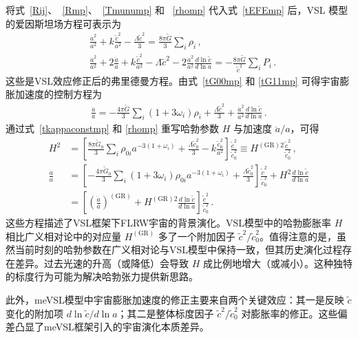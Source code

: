 \documentclass[jkps,preprint,fleqn]{revtex4}
\newcommand{\tc}{\tilde{c}}
\newcommand{\tG}{\tilde{G}}
\newcommand{\GR}{\text{GR}}
\begin{document}
将式~\eqref{Rij}、~\eqref{Rmp}、~\eqref{Tmunump} 和 ~\eqref{rhomp} 代入式~\eqref{tEFEmp} 后，VSL 模型的爱因斯坦场方程可表示为
\begin{align}
 &\frac{\dot{a}^2}{a^2} + k \frac{\tc^2}{a^2}  -\frac{ \Lambda \tc^2}{3} = \frac{8 \pi \tG}{3} \sum_i \rho_i \label{tG00mp} \,, \\
 &\frac{\dot{a}^2}{a^2} + 2 \frac{\ddot{a}}{a} +  k \frac{\tc^2}{a^2} - \Lambda \tc^2 - 2 \frac{\dot{a}^2}{a^2} \frac{d \ln \tc}{d \ln a} = -\frac{8 \pi \tG}{\tc^2} \sum_{i} P_i  \label{tG11mp} \,.
 \end{align}
这些是VSL效应修正后的弗里德曼方程。由式~\eqref{tG00mp} 和 \eqref{tG11mp} 可得宇宙膨胀加速度的控制方程为
\begin{align}
 \frac{\ddot{a}}{a} = -\frac{4\pi \tG}{3} \sum_i \left( 1 + 3 \omega_i \right) \rho_i  + \frac{\Lambda \tc^2}{3} + \frac{\dot{a}^2}{a^2} \frac{d \ln \tc}{d \ln a} \label{t3G11mG00mp} \,.
 \end{align}
通过式~\eqref{tkappaconstmp} 和 \eqref{rhomp} 重写哈勃参数 $H$ 与加速度 $\ddot{a}/a$，可得
\begin{align}
 H^2 &= \left[ \frac{8 \pi \tG_0}{3} \sum_{i} \rho_{0i} a^{-3(1+\omega_i)} + \frac{ \Lambda \tc_0^2}{3} - k \frac{\tc_0^2}{a^2} \right] \frac{\tc^2}{\tc_0^2} \equiv H^{(\GR)2} \frac{\tc^2}{\tc_0^2} \label{H2me} \,, \\
 \frac{\ddot{a}}{a} &= \left[ -\frac{4\pi \tG_0}{3} \sum_i \left( 1 + 3 \omega_i \right) \rho_{0i} a^{-3(1+\omega_i)} + \frac{\Lambda \tc_0^2}{3} \right] \frac{\tc^2}{\tc_0^2} + H^2 \frac{d \ln \tc}{d \ln a} \nonumber \\
 &= \left[ \left( \frac{\ddot{a}}{a} \right)^{(\GR)} +  H^{(\GR)2} \frac{d \ln \tc}{d \ln a}  \right] \frac{\tc^2}{\tc_0^2} \label{ddotaoa} \,.
 \end{align}
这些方程描述了VSL框架下FLRW宇宙的背景演化。VSL模型中的哈勃膨胀率 $H$ 相比广义相对论中的对应量 $H^{(\GR)}$ 多了一个附加因子 $\tc^2/\tc_0^2$。值得注意的是，虽然当前时刻的哈勃参数在广义相对论与VSL模型中保持一致，但其历史演化过程存在差异。过去光速的升高（或降低）会导致 $H$ 成比例地增大（或减小）。这种独特的标度行为可能为解决哈勃张力提供新思路。

此外，meVSL模型中宇宙膨胀加速度的修正主要来自两个关键效应：其一是反映 $\tc$ 变化的附加项 $d \ln \tc/d \ln a$；其二是整体标度因子 $\tc^2/\tc_0^2$ 对膨胀率的修正。这些偏差凸显了meVSL框架引入的宇宙演化本质差异。
\end{document}
